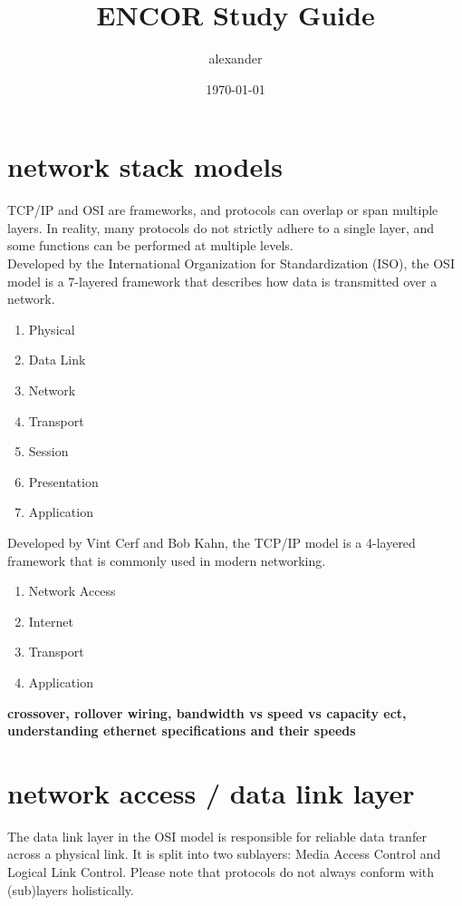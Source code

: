 \documentclass[parindent=0pt]{article}
\title{ENCOR Study Guide}
\author{alexander}
\date{\today}
\begin{document}
\maketitle

\section*{network stack models}

TCP/IP and OSI are frameworks, and protocols can overlap or span multiple layers. In reality, many protocols do not strictly adhere to a single layer, and some functions can be performed at multiple levels.\\

Developed by the International Organization for Standardization (ISO), the OSI model is a 
7-layered framework that describes how data is transmitted over a network.	
	\begin{enumerate}
		\item Physical
		\item Data Link
		\item Network
		\item Transport
		\item Session
		\item Presentation
		\item Application
	\end{enumerate}

Developed by Vint Cerf and Bob Kahn, the TCP/IP model is a 4-layered framework that is commonly 
used in modern networking.
	\begin{enumerate}
		\item Network Access
		\item Internet
		\item Transport
		\item Application
	\end{enumerate}

\textbf{crossover, rollover wiring, bandwidth vs speed vs capacity ect, understanding ethernet specifications and their speeds}

\section*{network access / data link layer}

The data link layer in the OSI model is responsible for reliable data tranfer across a physical link. It is split into two sublayers: Media Access Control and Logical Link Control. Please note that protocols do not always conform with (sub)layers holistically.\\ 
\end{document}
